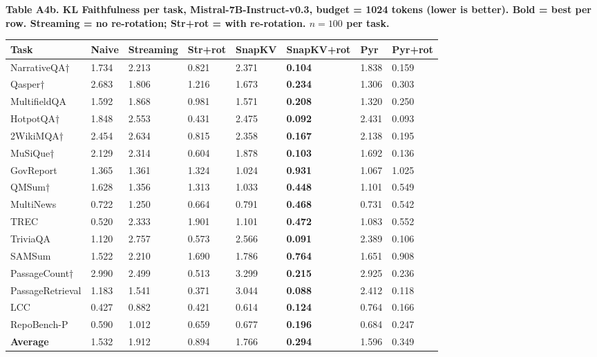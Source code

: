 \documentclass[10pt,letterpaper]{article}
\begin{document}
\textbf{Table A4b. KL Faithfulness per task, Mistral-7B-Instruct-v0.3,
budget = 1024 tokens (lower is better). Bold = best per row.
Streaming = no re-rotation; Str+rot = with re-rotation.
$n = 100$ per task.}

\begin{table}[H]
\centering
\small
\begin{tabular}{@{}llllllll@{}}
\toprule
Task & Naive & Streaming & Str+rot & SnapKV & SnapKV+rot & Pyr &
Pyr+rot\\
\midrule
NarrativeQA† & 1.734 & 2.213 & 0.821 & 2.371 & \textbf{0.104} & 1.838 &
0.159\\
Qasper† & 2.683 & 1.806 & 1.216 & 1.673 & \textbf{0.234} & 1.306 &
0.303\\
MultifieldQA & 1.592 & 1.868 & 0.981 & 1.571 & \textbf{0.208} & 1.320 &
0.250\\
HotpotQA† & 1.848 & 2.553 & 0.431 & 2.475 & \textbf{0.092} & 2.431 &
0.093\\
2WikiMQA† & 2.454 & 2.634 & 0.815 & 2.358 & \textbf{0.167} & 2.138 &
0.195\\
MuSiQue† & 2.129 & 2.314 & 0.604 & 1.878 & \textbf{0.103} & 1.692 &
0.136\\
GovReport & 1.365 & 1.361 & 1.324 & 1.024 & \textbf{0.931} & 1.067 &
1.025\\
QMSum† & 1.628 & 1.356 & 1.313 & 1.033 & \textbf{0.448} & 1.101 &
0.549\\
MultiNews & 0.722 & 1.250 & 0.664 & 0.791 & \textbf{0.468} & 0.731 &
0.542\\
TREC & 0.520 & 2.333 & 1.901 & 1.101 & \textbf{0.472} & 1.083 &
0.552\\
TriviaQA & 1.120 & 2.757 & 0.573 & 2.566 & \textbf{0.091} & 2.389 &
0.106\\
SAMSum & 1.522 & 2.210 & 1.690 & 1.786 & \textbf{0.764} & 1.651 &
0.908\\
PassageCount† & 2.990 & 2.499 & 0.513 & 3.299 & \textbf{0.215} & 2.925 &
0.236\\
PassageRetrieval & 1.183 & 1.541 & 0.371 & 3.044 & \textbf{0.088} & 2.412 &
0.118\\
LCC & 0.427 & 0.882 & 0.421 & 0.614 & \textbf{0.124} & 0.764 &
0.166\\
RepoBench-P & 0.590 & 1.012 & 0.659 & 0.677 & \textbf{0.196} & 0.684 &
0.247\\
\textbf{Average} & 1.532 & 1.912 & 0.894 & 1.766 & \textbf{0.294} & 1.596 &
0.349\\
\bottomrule
\end{tabular}
\end{table}
\end{document}
